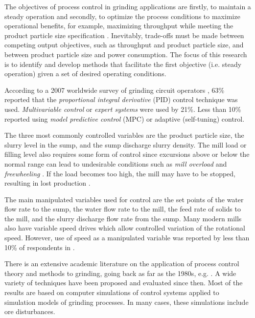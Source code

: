 The objectives of process control in grinding applications are firstly, to maintain a steady operation and secondly, to optimize the process conditions to maximize operational benefits, for example, maximizing throughput while meeting the product particle size specification \citep{wei_grinding_2009}. Inevitably, trade-offs must be made between competing output objectives, such as throughput and product particle size, and between product particle size and power consumption. The focus of this research is to identify and develop methods that facilitate the first objective (i.e. steady operation) given a set of desired operating conditions.

According to a 2007 worldwide survey of grinding circuit operators \citep{wei_grinding_2009}, 63\% reported that the \textit{proportional integral derivative} (PID) control technique was used. \textit{Multivariable control} or \textit{expert systems} were used by 21\%. Less than 10\% reported using \textit{model predictive control} (\gls{MPC}) or adaptive (self-tuning) control.

The three most commonly controlled variables are the product particle size, the slurry level in the sump, and the sump discharge slurry density. The mill load or filling level also requires some form of control since excursions above or below the normal range can lead to undesirable conditions such as \textit{mill overload} and \textit{freewheeling} \citep{mcclure_overload_2015}. If the load becomes too high, the mill may have to be stopped, resulting in lost production \citep{wei_grinding_2009}.

The main manipulated variables used for control are the set points of the water flow rate to the sump, the water flow rate to the mill, the feed rate of solids to the mill, and the slurry discharge flow rate from the sump. Many modern mills also have variable speed drives which allow controlled variation of the rotational speed. However, use of speed as a manipulated variable was reported by less than 10\% of respondents in \cite{wei_grinding_2009}.

There is an extensive academic literature on the application of process control theory and methods to grinding, going back as far as the 1980s, e.g. \cite{herbst_optimal_1988}. A wide variety of techniques have been proposed and evaluated since then. Most of the results are based on computer simulations of control systems applied to simulation models of grinding processes. In many cases, these simulations include ore disturbances.

